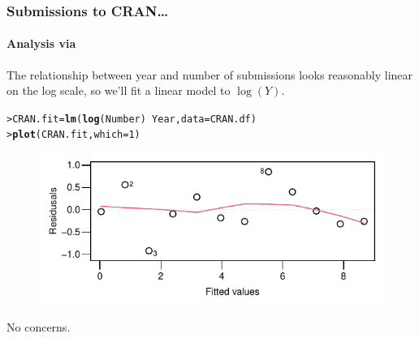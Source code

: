\documentclass{beamer}\usepackage[]{graphicx}\usepackage[]{xcolor}
\makeatletter
\newcommand{\hlnum}[1]{\textcolor[rgb]{0.686,0.059,0.569}{#1}}%
\newcommand{\hlopt}[1]{\textcolor[rgb]{0,0,0}{#1}}%
\newcommand{\hlstd}[1]{\textcolor[rgb]{0.345,0.345,0.345}{#1}}%
\newcommand{\hlkwb}[1]{\textcolor[rgb]{0.69,0.353,0.396}{#1}}%
\newcommand{\hlkwc}[1]{\textcolor[rgb]{0.333,0.667,0.333}{#1}}%
\newcommand{\hlkwd}[1]{\textcolor[rgb]{0.737,0.353,0.396}{\textbf{#1}}}%
\newenvironment{kframe}{%
 \def\at@end@of@kframe{}%
 \ifinner\ifhmode%
  \def\at@end@of@kframe{\end{minipage}}%
  \begin{minipage}{\columnwidth}%
 \fi\fi%
 \def\FrameCommand##1{\hskip\@totalleftmargin \hskip-\fboxsep
 \colorbox{shadecolor}{##1}\hskip-\fboxsep
     \hskip-\linewidth \hskip-\@totalleftmargin \hskip\columnwidth}%
 \MakeFramed {\advance\hsize-\width
   \@totalleftmargin\z@ \linewidth\hsize
   \@setminipage}}%
 {\par\unskip\endMakeFramed%
 \at@end@of@kframe}
\newenvironment{knitrout}{}{} %
\makeatother
\begin{document}
\begin{frame}[fragile]
\frametitle{Submissions to CRAN\ldots}
\framesubtitle{Analysis via }
\label{pg:CRAN LM}
The relationship between year and number of submissions looks reasonably linear on the log scale, so we'll fit a linear model to $\log(Y)$.
\medskip

\begin{knitrout}\scriptsize
{}\color{fgcolor}\begin{kframe}
\begin{alltt}
\hlstd{> }\hlstd{CRAN.fit} \hlkwb{=} \hlkwd{lm}\hlstd{(}\hlkwd{log}\hlstd{(Number)} \hlopt{~} \hlstd{Year,} \hlkwc{data} \hlstd{= CRAN.df)}
\hlstd{> }\hlkwd{plot}\hlstd{(CRAN.fit,}\hlkwc{which}\hlstd{=}\hlnum{1}\hlstd{)}
\end{alltt}
\end{kframe}
\end{knitrout}



\begin{figure}
  \centering
  \includegraphics[scale = 0.9]{figure/RC-H13-005a}
\end{figure}

No concerns.
\end{frame}
\end{document}
